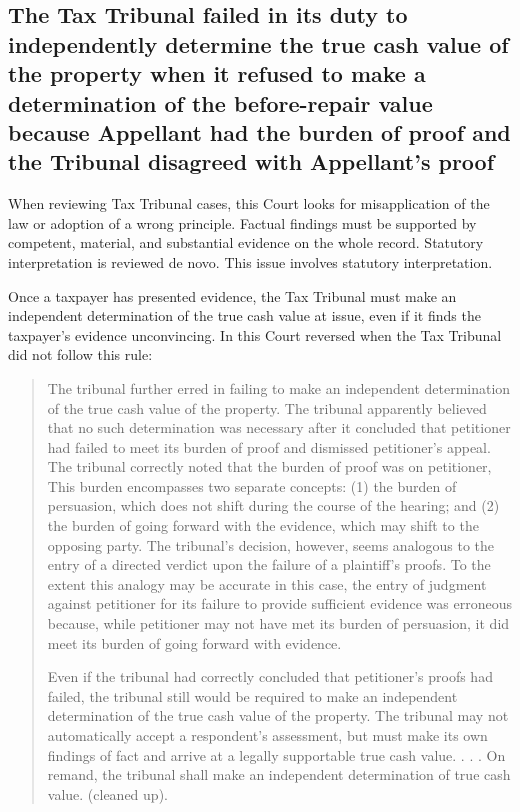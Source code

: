 \documentclass[12pt,\documentclassflag]{michiganCourtOfAppealsBrief}
\begin{document}
\subsection{The Tax Tribunal failed in its duty to independently determine the true cash value of the property when it refused to make a determination of the before-repair value because Appellant had the burden of proof and the Tribunal disagreed with  Appellant's proof 
}

When reviewing Tax Tribunal cases, this Court looks for misapplication of the law or adoption of a wrong principle. Factual findings must be supported by competent, material, and substantial evidence on the whole record. Statutory interpretation is reviewed de novo.  This issue involves statutory interpretation.

Once a taxpayer has presented evidence, the Tax Tribunal must make an independent determination of the true cash value at issue, even if it finds the taxpayer's evidence unconvincing. In \cite{Jones & Laughlin} this Court reversed when the Tax Tribunal did not follow this rule:

\begin{quotation}
	The tribunal further erred in failing to make an independent determination of the true cash value of the property. The tribunal apparently believed that no such determination was necessary after it concluded that petitioner had failed to meet its burden of proof and dismissed petitioner's appeal. The tribunal correctly noted that the burden of proof was on petitioner, This burden encompasses two separate concepts: (1) the burden of persuasion, which does not shift during the course of the hearing; and (2) the burden of going forward with the evidence, which may shift to the opposing party. The tribunal's decision, however, seems analogous to the entry of a directed verdict upon the failure of a plaintiff's proofs. To the extent this analogy may be accurate in this case, the entry of judgment against petitioner for its failure to provide sufficient evidence was erroneous because, while petitioner may not have met its burden of persuasion, it did meet its burden of going forward with evidence.
	
	Even if the tribunal had correctly concluded that petitioner's proofs had failed, the tribunal still would be required to make an independent determination of the true cash value of the property. The tribunal may not automatically accept a respondent's assessment, but must make its own findings of fact and arrive at a legally supportable true cash value. . . . On remand, the tribunal shall make an independent determination of true cash value.  (cleaned up).
\end{quotation}
\end{document}
